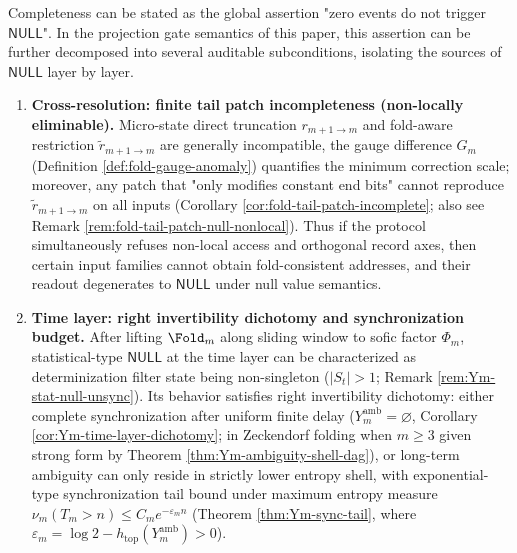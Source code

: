 \begin{remark}\label{rem:xi-completeness-auditable-decomposition}
Completeness can be stated as the global assertion "zero events do not trigger \(\mathsf{NULL}\)".
In the projection gate semantics of this paper, this assertion can be further decomposed into several auditable subconditions, isolating the sources of \(\mathsf{NULL}\) layer by layer.
\begin{enumerate}
  \item \textbf{Cross-resolution: finite tail patch incompleteness (non-locally eliminable).} Micro-state direct truncation \(r_{m+1\to m}\) and fold-aware restriction \(\widetilde r_{m+1\to m}\) are generally incompatible, the gauge difference \(G_m\) (Definition \ref{def:fold-gauge-anomaly}) quantifies the minimum correction scale; moreover, any patch that "only modifies constant end bits" cannot reproduce \(\widetilde r_{m+1\to m}\) on all inputs (Corollary \ref{cor:fold-tail-patch-incomplete}; also see Remark \ref{rem:fold-tail-patch-null-nonlocal}). Thus if the protocol simultaneously refuses non-local access and orthogonal record axes, then certain input families cannot obtain fold-consistent addresses, and their readout degenerates to \(\mathsf{NULL}\) under null value semantics.

  \item \textbf{Time layer: right invertibility dichotomy and synchronization budget.} After lifting \(\Fold_m\) along sliding window to sofic factor \(\Phi_m\), statistical-type \(\mathsf{NULL}\) at the time layer can be characterized as determinization filter state being non-singleton (\(|S_t|>1\); Remark \ref{rem:Ym-stat-null-unsync}). Its behavior satisfies right invertibility dichotomy: either complete synchronization after uniform finite delay (\(Y_m^{\mathrm{amb}}=\varnothing\), Corollary \ref{cor:Ym-time-layer-dichotomy}; in Zeckendorf folding when \(m\ge 3\) given strong form by Theorem \ref{thm:Ym-ambiguity-shell-dag}), or long-term ambiguity can only reside in strictly lower entropy shell, with exponential-type synchronization tail bound under maximum entropy measure \(\nu_m(T_m>n)\le C_m e^{-\varepsilon_m n}\) (Theorem \ref{thm:Ym-sync-tail}, where \(\varepsilon_m=\log 2-h_{\mathrm{top}}(Y_m^{\mathrm{amb}})>0\)).


\end{enumerate}
\end{remark}

